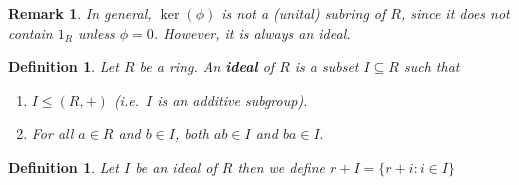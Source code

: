\documentclass[a4paper,12pt]{article}
\newtheorem{defn}[thm]{Definition}
\newtheorem{rmk}[thm]{Remark}
\begin{document}
\begin{rmk}
    In general, $\ker(\phi)$ is not a (unital) subring of $R$, since it does not contain $1_R$ unless $\phi=0$. However, it is always an ideal.
\end{rmk}
\begin{defn}
    Let $R$ be a ring. An \textbf{ideal} of $R$ is a subset $I\subseteq R$ such that
    \begin{enumerate}
        \item $I\leq (R,+)$ (i.e.\ $I$ is an additive subgroup).
        \item For all $a\in R$ and $b\in I$, both $ab\in I$ and $ba\in I.$ 
    \end{enumerate}
\end{defn}
\begin{defn}
    Let $I$ be an ideal of $R$ then we define $r+I= \{r+i: i\in I\}$
\end{defn}
\newpage
\end{document}
